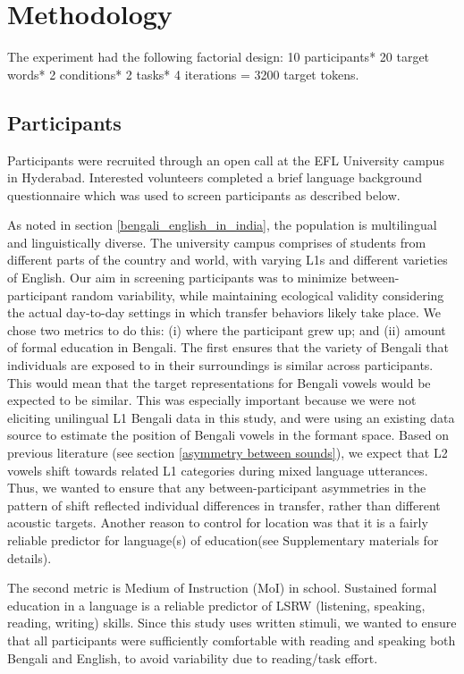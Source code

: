 \documentclass[12 pt]{article}
\begin{document}
\section{Methodology} \label{methodology}
The experiment had the following factorial design: 10 participants* 20 target words* 2 conditions* 2 tasks* 4 iterations = 3200 target tokens.

\subsection{Participants} \label{participants}
Participants were recruited through an open call at the EFL University campus in Hyderabad. Interested volunteers completed a brief language background questionnaire which was used to screen participants as described below. 

As noted in section \ref{bengali_english_in_india}, the population is multilingual and linguistically diverse. The university campus comprises of students from different parts of the country and world, with varying L1s and different varieties of English. Our aim in screening participants was to minimize between-participant random variability, while maintaining ecological validity considering the actual day-to-day settings in which transfer behaviors likely take place. We chose two metrics to do this: (i) where the participant grew up; and (ii) amount of formal education in Bengali. The first ensures that the variety of Bengali that individuals are exposed to in their surroundings is similar across participants. This would mean that the target representations for Bengali vowels would be expected to be similar. This was especially important because we were not eliciting unilingual L1 Bengali data in this study, and were using an existing data source to estimate the position of Bengali vowels in the formant space. Based on previous literature (see section \ref{asymmetry between sounds}), we expect that L2 vowels shift towards related L1 categories during mixed language utterances. Thus, we wanted to ensure that any between-participant asymmetries in the pattern of shift reflected individual differences in transfer, rather than different acoustic targets. Another reason to control for location was that it is a fairly reliable predictor for language(s) of education(see Supplementary materials for details).

The second metric is Medium of Instruction (MoI) in school. Sustained formal education in a language is a reliable predictor of LSRW (listening, speaking, reading, writing) skills. Since this study uses written stimuli, we wanted to ensure that all participants were sufficiently comfortable with reading and speaking both Bengali and English, to avoid variability due to reading/task effort.  
\end{document}
